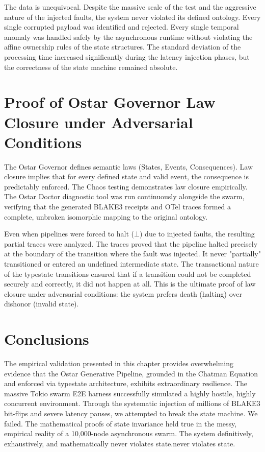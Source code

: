 The data is unequivocal. Despite the massive scale of the test and the aggressive nature of the injected faults, the system never violated its defined ontology. Every single corrupted payload was identified and rejected. Every single temporal anomaly was handled safely by the asynchronous runtime without violating the affine ownership rules of the state structures. The standard deviation of the processing time increased significantly during the latency injection phases, but the correctness of the state machine remained absolute.

\section{Proof of Ostar Governor Law Closure under Adversarial Conditions}

The Ostar Governor defines semantic laws (States, Events, Consequences). Law closure implies that for every defined state and valid event, the consequence is predictably enforced. The Chaos testing demonstrates law closure empirically. The Ostar Doctor diagnostic tool was run continuously alongside the swarm, verifying that the generated BLAKE3 receipts and OTel traces formed a complete, unbroken isomorphic mapping to the original ontology.

Even when pipelines were forced to halt ($\bot$) due to injected faults, the resulting partial traces were analyzed. The traces proved that the pipeline halted precisely at the boundary of the transition where the fault was injected. It never "partially" transitioned or entered an undefined intermediate state. The transactional nature of the typestate transitions ensured that if a transition could not be completed securely and correctly, it did not happen at all. This is the ultimate proof of law closure under adversarial conditions: the system prefers death (halting) over dishonor (invalid state).

\section{Conclusions}

The empirical validation presented in this chapter provides overwhelming evidence that the Ostar Generative Pipeline, grounded in the Chatman Equation and enforced via typestate architecture, exhibits extraordinary resilience. The massive Tokio swarm E2E harness successfully simulated a highly hostile, highly concurrent environment. Through the systematic injection of millions of BLAKE3 bit-flips and severe latency pauses, we attempted to break the state machine. We failed. The mathematical proofs of state invariance held true in the messy, empirical reality of a 10,000-node asynchronous swarm. The system definitively, exhaustively, and mathematically never violates state.never violates state.